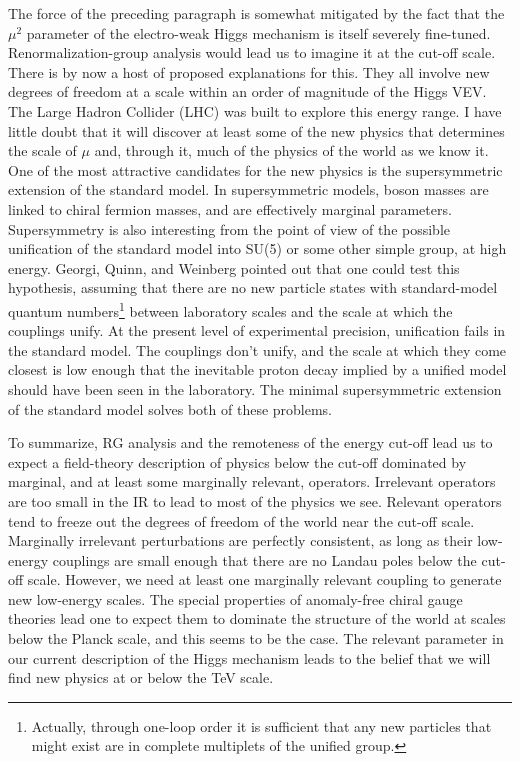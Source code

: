 The force of the preceding paragraph is somewhat mitigated by the fact that
the $\mu^2$ parameter of the electro-weak Higgs mechanism is itself severely
fine-tuned. Renormalization-group analysis would lead us to imagine it at the
cut-off scale. There is by now a host of proposed explanations for this. They
all involve new degrees of freedom at a scale within an order of magnitude of
the Higgs VEV. The Large Hadron Collider (LHC) was built to explore this energy
range. I have little doubt that it will discover at least some of the new
physics that determines the scale of $\mu$ and, through it, much of the physics
of the world as we know it. One of the most attractive candidates for the new
physics is the supersymmetric extension of the standard model. In
supersymmetric models, boson masses are linked to chiral fermion masses, and
are effectively marginal parameters. Supersymmetry is also interesting from
the point of view of the possible unification of the standard model into
SU(5) or some other simple group, at high energy. Georgi, Quinn, and Weinberg
\cite{banks-ref-132} pointed out that one could test this hypothesis, assuming
that there are no new particle states with standard-model quantum numbers\footnote[23]{Actually,
through one-loop order it is sufficient that any new particles that might exist
are in complete multiplets of the unified group.} between laboratory scales
and the scale at which the couplings unify. At the present level of
experimental precision, unification fails in the standard model. The couplings
don't unify, and the scale at which they come closest is low enough that the
inevitable proton decay implied by a unified model should have been seen in the
laboratory. The minimal supersymmetric extension of the standard model solves
both of these problems.

To summarize, RG analysis and the remoteness of the energy cut-off lead us to
expect a field-theory description of physics below the cut-off dominated by
marginal, and at least some marginally relevant, operators. Irrelevant
operators are too small in the IR to lead to most of the physics we see.
Relevant operators tend to freeze out the degrees of freedom of the world near
the cut-off scale. Marginally irrelevant perturbations are perfectly
consistent, as long as their low-energy couplings are small enough that there
are no Landau poles below the cut-off scale. However, we need at least one
marginally relevant coupling to generate new low-energy scales. The special
properties of anomaly-free chiral gauge theories lead one to expect them to
dominate the structure of the world at scales below the Planck scale, and this
seems to be the case. The relevant parameter in our current description of the
Higgs mechanism leads to the belief that we will find new physics at or below
the TeV scale.

